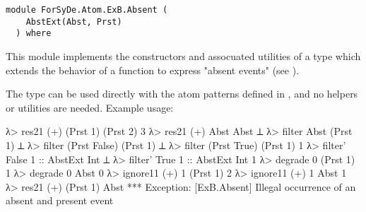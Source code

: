 \label{module:ForSyDe.Atom.ExB.Absent}
\haddockbeginheader
{\haddockverb\begin{verbatim}
module ForSyDe.Atom.ExB.Absent (
    AbstExt(Abst, Prst) 
  ) where\end{verbatim}}
\haddockendheader

This module implements the constructors and assocuated utilities of
 a type which extends the behavior of a function to express "absent
 events" (see \cite{Halbwachs91}).\par
The  type can be used directly with the atom patterns
 defined in , and no helpers or utilities are
 needed. Example usage:\par
\begin{interactive}
λ> res21 (+) (Prst 1) (Prst 2)
3
λ> res21 (+) Abst     Abst
⟂
λ> filter Abst         (Prst 1)
⟂
λ> filter (Prst False) (Prst 1)
⟂
λ> filter (Prst True)  (Prst 1)
1
λ> filter' False 1 :: AbstExt Int
⟂
λ> filter' True  1 :: AbstExt Int
1
λ> degrade 0 (Prst 1)
1
λ> degrade 0 Abst
0
λ> ignore11 (+) 1 (Prst 1)
2
λ> ignore11 (+) 1 Abst
1
λ> res21 (+) (Prst 1) Abst 
*** Exception: [ExB.Absent] Illegal occurrence of an absent and present event
\end{interactive}
           
